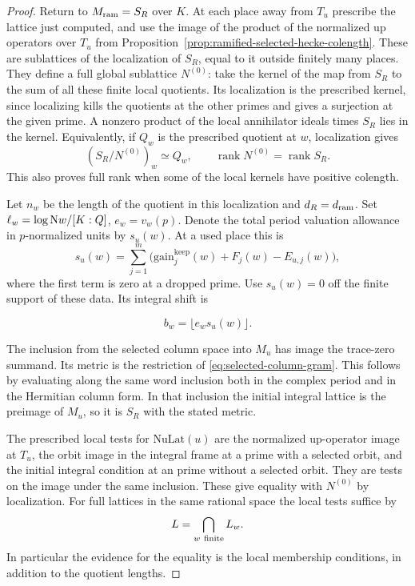 \begin{proof}

Return to \(M_{\rm ram}=S_R\) over \(K\). At each place away from
\(T_u\) prescribe the lattice just computed, and use the image of
the product of the normalized up operators over \(T_u\) from
Proposition~\ref{prop:ramified-selected-hecke-colength}. These are sublattices of
the localization of \(S_R\), equal to it outside finitely many
places. They define a full global sublattice \(N^{(0)}\): take the
kernel of the map from \(S_R\) to the sum of all these finite
local quotients. Its localization is the prescribed kernel, since
localizing kills the quotients at the other primes and gives a
surjection at the given prime. A nonzero product of the local
annihilator ideals times \(S_R\) lies in the kernel.
Equivalently, if \(Q_w\) is the prescribed quotient at \(w\), localization gives
\[
  (S_R/N^{(0)})_w\simeq Q_w,\qquad \operatorname{rank}N^{(0)}=\operatorname{rank}S_R .
\]
 This also
proves full rank when some of the local kernels have positive
colength.

Let \(n_w\) be the length of the quotient in this
localization and \(d_R=d_{\rm ram}\). Set
\(\ell_w=\log {\rm N}w/[K:\mathbb Q]\), \(e_w=v_w(p)\). Denote the
total period valuation allowance in \(p\)-normalized units by
\(s_u(w)\). At a used place this is
\[
 s_u(w)=\sum_{j=1}^m
 \bigl(\mathrm{gain}^{\mathrm{keep}}_j(w)+F_j(w)-E_{u,j}(w)\bigr),
\]
where the first term is zero at a dropped prime. Use \(s_u(w)=0\)
off the finite support of these data. Its integral shift is

\[
  b_w=\lfloor e_ws_u(w)\rfloor.
\]


The inclusion from the selected column space into \(M_u\)
has image the trace-zero summand. Its metric is the
restriction of \eqref{eq:selected-column-gram}. This follows
by evaluating along the same word inclusion both in the
complex period and in the Hermitian column form. In that
inclusion the initial integral lattice is the preimage
of \(M_u\), so it is \(S_R\) with the stated metric.

The prescribed local tests for \(\mathrm{NuLat}(u)\) are
the normalized up-operator image at \(T_u\), the orbit
image in the integral frame at a prime with a selected orbit, and the
initial integral condition at an prime without a selected orbit. They
are tests on the image under the same inclusion.
These give equality with \(N^{(0)}\) by localization.
For full lattices in the same rational space the local tests suffice by
\[
  L=\bigcap_{w\ {\rm finite}} L_w .
\]
In particular the evidence for the equality is the local
membership conditions, in addition to the quotient lengths.


\end{proof}
